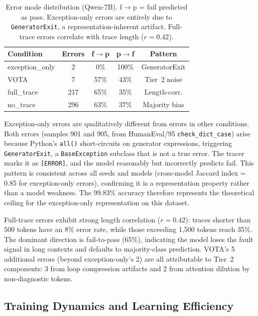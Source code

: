 \documentclass[11pt,a4paper]{article}
\begin{document}
\begin{table}[t]
\centering
\small
\begin{tabular}{lcccc}
\toprule
\textbf{Condition} & \textbf{Errors} & \textbf{f$\to$p} & \textbf{p$\to$f} & \textbf{Pattern} \\
\midrule
exception\_only & 2 & 0\% & 100\% & GeneratorExit \\
VOTA & 7 & 57\% & 43\% & Tier~2 noise \\
full\_trace & 217 & 65\% & 35\% & Length-corr. \\
no\_trace & 296 & 63\% & 37\% & Majority bias \\
\bottomrule
\end{tabular}
\caption{Error mode distribution (Qwen-7B). f$\to$p = fail predicted as pass. Exception-only errors are entirely due to \texttt{GeneratorExit}, a representation-inherent artifact. Full-trace errors correlate with trace length ($r = 0.42$).}
\label{tab:errors}
\end{table}

Exception-only errors are qualitatively different from errors in other conditions. Both errors (samples 901 and 905, from HumanEval/95 \texttt{check\_dict\_case}) arise because Python's \texttt{all()} short-circuits on generator expressions, triggering \texttt{GeneratorExit}, a \texttt{BaseException} subclass that is not a true error. The tracer marks it as \texttt{[ERROR]}, and the model reasonably but incorrectly predicts fail. This pattern is consistent across all seeds and models (cross-model Jaccard index = 0.85 for exception-only errors), confirming it is a representation property rather than a model weakness. The 99.83\% accuracy therefore represents the theoretical ceiling for the exception-only representation on this dataset.

Full-trace errors exhibit strong length correlation ($r = 0.42$): traces shorter than 500 tokens have an 8\% error rate, while those exceeding 1,500 tokens reach 35\%. The dominant direction is fail-to-pass (65\%), indicating the model loses the fault signal in long contexts and defaults to majority-class prediction. VOTA's 5 additional errors (beyond exception-only's 2) are all attributable to Tier~2 components: 3 from loop compression artifacts and 2 from attention dilution by non-diagnostic tokens.

\subsection{Training Dynamics and Learning Efficiency}
\label{sec:dynamics}
\end{document}
